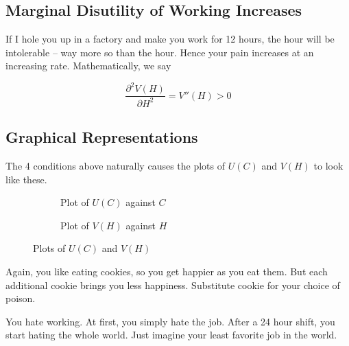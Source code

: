 \documentclass[11pt]{scrartcl}
\begin{document}
\subsection{Marginal Disutility of Working Increases}
If I hole you up in a factory and make you work for 12 hours, the  hour will be intolerable -- way more so than the  hour. Hence your pain increases at an increasing rate. Mathematically, we say

\[\frac{\partial^2 V(H)}{\partial H^2} = V''(H) > 0\]

\subsection{Graphical Representations}

The 4 conditions above naturally causes the plots of $U(C)$ and $V(H)$ to look like these. 

\begin{figure}[ht!]
\begin{subfigure}[b]{0.5\textwidth}
\caption{Plot of $U(C)$ against $C$}
\end{subfigure}
\hspace{2ex}
\begin{subfigure}[b]{0.5\textwidth}
\caption{Plot of $V(H)$ against $H$}
\end{subfigure}
\caption{Plots of $U(C)$ and $V(H)$}
\end{figure}

Again, you like eating cookies, so you get happier as you eat them. But each additional cookie brings you less happiness. Substitute cookie for your choice of poison.

You hate working. At first, you simply hate the job. After a 24 hour shift, you start hating the whole world. Just imagine your least favorite job in the world.
\end{document}

